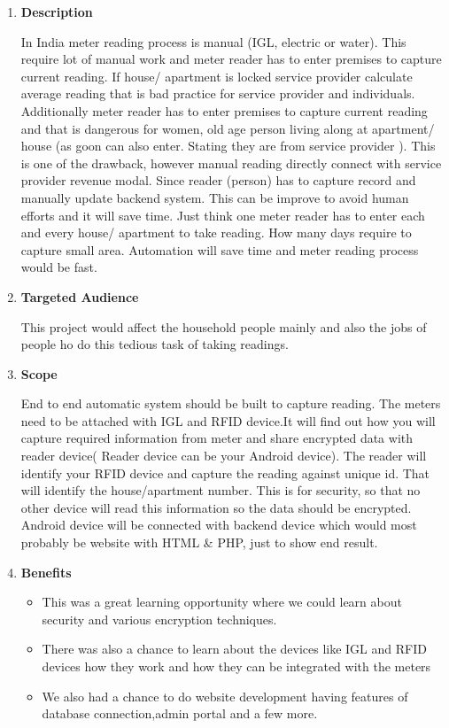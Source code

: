 \documentclass[fleqn,10pt]{../SelfArx} %
\begin{document}
\vspace{0.5cm}
\begin{enumerate}
\item \textbf{Description}


In India meter reading process is manual (IGL, electric or water). This require lot of manual work and meter reader has to enter premises to capture current reading.
If house/ apartment is locked service provider calculate average reading that is bad practice for service provider and individuals.
Additionally meter reader has to enter premises to capture current reading and that is dangerous for women, old age person living along at apartment/ house (as goon can also enter. Stating they are from service provider ). This is one of the drawback, however manual reading directly connect with service provider revenue modal. Since reader (person) has to capture record and manually update backend system. This can be improve to avoid human efforts and it will save time.
Just think one meter reader has to enter each and every house/ apartment to take reading. How many days require to capture small area. Automation will save time and meter reading process would be fast.

\item \textbf{Targeted Audience}

This project would affect the household people mainly and also the jobs of people ho do this tedious task of taking readings.

\item \textbf{Scope}


End to end automatic system should be built to capture reading. The meters need to be attached with IGL and RFID device.It will find out how you will capture required information from meter and share encrypted data with reader device( Reader device can be your Android device). The reader will identify your RFID device and capture the reading against unique id. That will identify the house/apartment number. This is for security, so that no other device will read this information so the data should be encrypted. Android device will be connected with  backend device which would most probably be  website with HTML \& PHP, just to show end result.

\item \textbf{Benefits}
\begin{itemize}
    \item This was a great learning opportunity where we could learn about security and various encryption techniques.
    \item There was also a chance to learn about the devices like IGL and RFID devices how they work and how they can be integrated with the meters
    \item We also had a chance to do website development having features of database connection,admin portal and a few more.
\end{itemize}


\end{enumerate}
\end{document}
